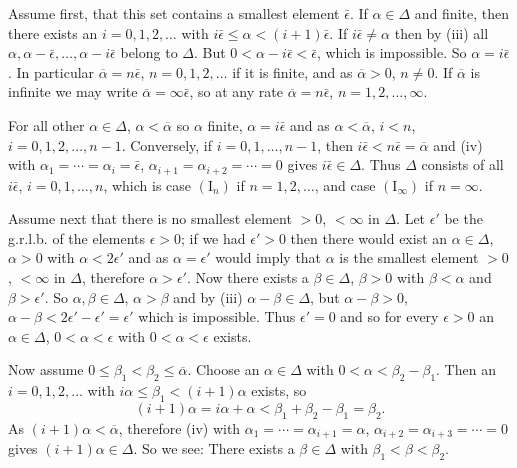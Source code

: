 \documentclass[12pt,b5paper,twoside]{article}
\begin{document}
Assume first, that this set contains a smallest element $\bar\epsilon$. If
$\alpha\in\Delta$ and finite, then there exists an $i=0,1,2,\ldots$ with
$i\bar\epsilon\leq\alpha<(i+1)\bar\epsilon$. If
$i\bar\epsilon\ne\alpha$ then by (iii) all
$\alpha,\alpha-\bar\epsilon,\ldots,\alpha-i\bar\epsilon$ belong to $\Delta$.
But $0<\alpha-i\bar\epsilon<\bar\epsilon$, which is impossible. So
$\alpha=i\bar\epsilon$. In particular
$\overline\alpha=n\bar\epsilon$, $n=0,1,2,\ldots$ if it is finite, and as
$\overline\alpha>0$, $n\ne0$. If $\overline\alpha$ is infinite we may write
$\overline\alpha=\infty\bar\epsilon$, so at any rate
$\overline\alpha=n\bar\epsilon$, $n=1,2,\ldots,\infty$.

For all other $\alpha\in\Delta$, $\alpha<\overline\alpha$ so $\alpha$ finite,
$\alpha=i\bar\epsilon$ and as $\alpha<\overline\alpha$, $i<n$,
$i=0,1,2,\ldots,n-1$. Conversely, if $i=0,1,\ldots,n-1$, then
$i\bar\epsilon<n\bar\epsilon=\overline\alpha$ and (iv) with
$\alpha_1=\cdots=\alpha_i=\bar\epsilon$,
$\alpha_{i+1}=\alpha_{i+2}=\cdots=0$ gives $i\bar\epsilon\in\Delta$. Thus
$\Delta$ consists of all $i\bar\epsilon$, $i=0,1,\ldots,n$, which is case
$(\mathrm I_n)$ if $n=1,2,\ldots$, and case $(\mathrm I_\infty)$ if
$n=\infty$.

Assume next that there is no smallest element $>0$, $<\infty$ in $\Delta$.
Let $\epsilon'$ be the g.r.l.b. of the elements $\epsilon>0$; if we had
$\epsilon'>0$ then there would exist an $\alpha\in\Delta$, $\alpha>0$ with
$\alpha<2\epsilon'$ and as $\alpha=\epsilon'$ would imply that $\alpha$ is the
smallest element $>0$, $<\infty$ in $\Delta$, therefore $\alpha>\epsilon'$.
Now there exists a $\beta\in\Delta$, $\beta>0$ with $\beta<\alpha$ and
$\beta>\epsilon'$. So $\alpha,\beta\in\Delta$, $\alpha>\beta$ and by (iii)
$\alpha-\beta\in\Delta$, but $\alpha-\beta>0$,
$\alpha-\beta<2\epsilon'-\epsilon'=\epsilon'$ which is impossible. Thus
$\epsilon'=0$ and so for every $\epsilon>0$ an $\alpha\in\Delta$,
$0<\alpha<\epsilon$ with $0<\alpha<\epsilon$ exists.

Now assume $0\leq\beta_1<\beta_2\leq\overline\alpha$. Choose an
$\alpha\in\Delta$ with $0<\alpha<\beta_2-\beta_1$. Then an
$i=0,1,2,\ldots$ with $i\alpha\leq\beta_1<(i+1)\alpha$ exists, so
\[
 (i+1)\alpha=i\alpha+\alpha<\beta_1+\beta_2-\beta_1=\beta_2.
\]
As $(i+1)\alpha<\overline\alpha$, therefore (iv) with
$\alpha_1=\cdots=\alpha_{i+1}=\alpha$,
$\alpha_{i+2}=\alpha_{i+3}=\cdots=0$ gives $(i+1)\alpha\in\Delta$. So we see:
There exists a $\beta\in\Delta$ with $\beta_1<\beta<\beta_2$.
\end{document}
